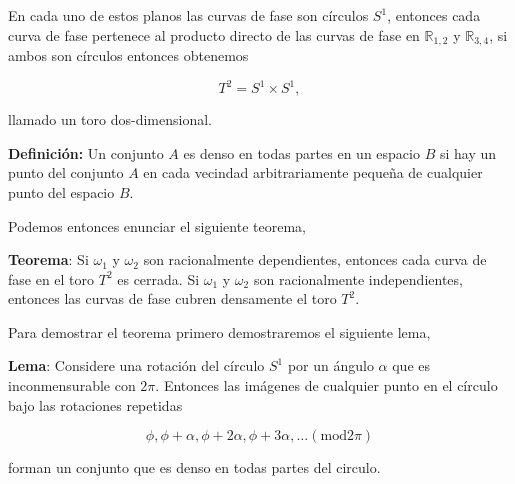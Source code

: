 \documentclass[a4paper,10pt]{article}
\numberwithin{equation}{section}
\begin{document}
En cada uno de estos planos las curvas de fase son círculos $S^1$, entonces cada 
curva de fase pertenece al producto directo de las curvas de fase en $\mathbb{R}_{1,2}$ y
$\mathbb{R}_{3,4}$, si ambos son círculos entonces obtenemos 


\begin{equation}
 T^2 = S^1 \times S^1,
\end{equation}

llamado un toro dos-dimensional. 

\vspace{.3cm}

\textbf{Definición:} Un conjunto $A$ es denso en todas partes en un espacio $B$ 
si hay un punto del conjunto $A$ en cada vecindad arbitrariamente pequeña de 
cualquier punto del espacio $B$.

Podemos entonces enunciar el siguiente teorema,

\vspace{.3cm}

\textbf{Teorema}: Si $\omega_1$ y $\omega_2$ son racionalmente dependientes, entonces 
cada curva de fase en el toro $T^2$ es cerrada. Si $\omega_1$ y $\omega_2$ son racionalmente
independientes, entonces las curvas de fase cubren densamente el toro $T^2$. 

\vspace{.3cm}

Para demostrar el teorema primero demostraremos el siguiente lema,

\vspace{.3cm}

\textbf{Lema}: Considere una rotación del círculo $S^1$ por un ángulo $\alpha$ que 
es inconmensurable con $2\pi$. Entonces las imágenes de cualquier punto en el círculo 
bajo las rotaciones repetidas

\begin{equation}
 \phi, \phi + \alpha, \phi + 2\alpha, \phi + 3\alpha, \dots (\text{mod} 2\pi)
\end{equation}

forman un conjunto que es denso en todas partes del circulo.

\vspace{.3cm}
\end{document}
